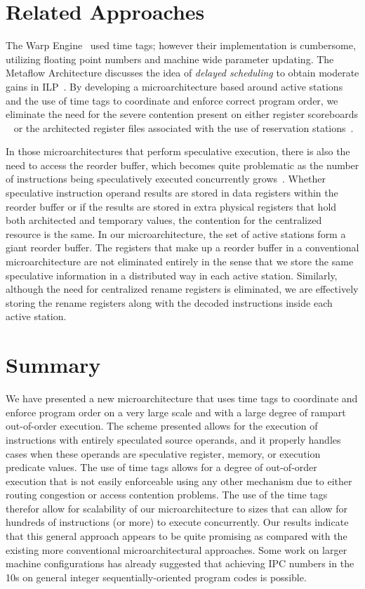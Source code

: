 \documentclass[10pt,dvips]{article}
\begin{document}
\section{Related Approaches}
%
The Warp Engine~\cite{Cleary95} used time tags; however their implementation
is cumbersome, utilizing floating point numbers and machine wide parameter
updating.  The Metaflow Architecture discusses the 
idea of {\em delayed scheduling}
to obtain moderate gains in ILP~\cite{Pop}.
By developing a microarchitecture based around active stations
and the use of time tags to coordinate and enforce correct program
order, we eliminate the need for the severe contention present 
on either register scoreboards ~\cite{Thornton64} 
or the architected register files associated
with the use of reservation stations~\cite{Anderson67}.  

In those microarchitectures
that perform speculative execution, there is also
the need to access the reorder buffer, which becomes quite problematic
as the number of instructions being speculatively executed concurrently
grows~\cite{Palacharla97}.  Whether speculative instruction operand
results are stored in data registers within the reorder buffer or if the
results are stored in extra physical registers that hold both architected
and temporary values, the contention for the centralized resource is
the same.  In our microarchitecture, the set of active
stations form a giant reorder buffer.  The registers that
make up a reorder buffer in a conventional microarchitecture are
not eliminated entirely in the sense that we store the same speculative
information in a distributed way in each active station.  Similarly,
although the need for centralized rename registers is eliminated,
we are effectively storing the rename registers along with the
decoded instructions inside each active station.  
%
%
\section{Summary}
%
We have presented a new microarchitecture
that uses time tags to coordinate and enforce
program order on a very large scale and with a large degree
of rampart out-of-order execution.
The scheme presented allows for the execution of instructions
with entirely speculated source operands, and it properly
handles cases when these operands are speculative register,
memory, or execution predicate values.
The use of time tags allows for a degree of out-of-order
execution that is not easily enforceable using any other
mechanism due to either routing congestion or access contention
problems.
The use of the time tags therefor allow for scalability of our 
microarchitecture
to sizes that can allow for hundreds of instructions (or more) to execute
concurrently.
Our results indicate that this general approach appears to be quite
promising as compared with the existing more conventional microarchitectural
approaches.  
Some work on larger machine configurations has already
suggested that achieving IPC numbers in the 10s on general integer
sequentially-oriented program codes is possible.
%


%
\end{document}
